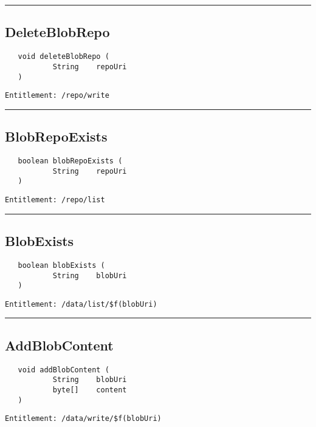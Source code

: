 \rule{12cm}{2pt}
\subsection{DeleteBlobRepo}
\label{Api:DeleteBlobRepo}
\begin{Verbatim}
   void deleteBlobRepo (
           String    repoUri
   )
\end{Verbatim}
\begin{Verbatim}[formatcom=\color{Maroon}]
  Entitlement: /repo/write
\end{Verbatim}



\rule{12cm}{2pt}
\subsection{BlobRepoExists}
\label{Api:BlobRepoExists}
\begin{Verbatim}
   boolean blobRepoExists (
           String    repoUri
   )
\end{Verbatim}
\begin{Verbatim}[formatcom=\color{Maroon}]
  Entitlement: /repo/list
\end{Verbatim}



\rule{12cm}{2pt}
\subsection{BlobExists}
\label{Api:BlobExists}
\begin{Verbatim}
   boolean blobExists (
           String    blobUri
   )
\end{Verbatim}
\begin{Verbatim}[formatcom=\color{Maroon}]
  Entitlement: /data/list/$f(blobUri)
\end{Verbatim}



\rule{12cm}{2pt}
\subsection{AddBlobContent}
\label{Api:AddBlobContent}
\begin{Verbatim}
   void addBlobContent (
           String    blobUri
           byte[]    content
   )
\end{Verbatim}
\begin{Verbatim}[formatcom=\color{Maroon}]
  Entitlement: /data/write/$f(blobUri)
\end{Verbatim}



